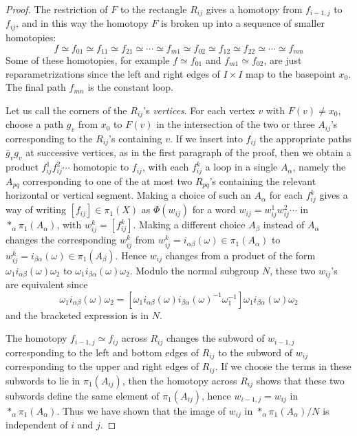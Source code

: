 \begin{proof}
The restriction of $F$ to the rectangle $R_{ij}$ gives a homotopy from $f_{i-1,j}$ to $f_{ij}$, and in this way the homotopy $F$ is broken up into a sequence of smaller homotopies:
\[
f \simeq f_{01} \simeq f_{11} \simeq f_{21} \simeq \cdots \simeq f_{m1} \simeq f_{02} \simeq f_{12} \simeq f_{22} \simeq \cdots \simeq f_{mn}
\]
Some of these homotopies, for example $f \simeq f_{01}$ and $f_{m1} \simeq f_{02}$, are just reparametrizations since the left and right edges of $I \times I$ map to the basepoint $x_0$. The final path $f_{mn}$ is the constant loop.

Let us call the corners of the $R_{ij}$'s \textit{vertices}. For each vertex $v$ with $F(v) \neq x_0$, choose a path $g_v$ from $x_0$ to $F(v)$ in the intersection of the two or three $A_{ij}$'s corresponding to the $R_{ij}$'s containing $v$. If we insert into $f_{ij}$ the appropriate paths $\bar{g}_v g_v$ at successive vertices, as in the first paragraph of the proof, then we obtain a product $f_{ij}^1 f_{ij}^2 \cdots$ homotopic to $f_{ij}$, with each $f_{ij}^k$ a loop in a single $A_\alpha$, namely the $A_{pq}$ corresponding to one of the at most two $R_{pq}$'s containing the relevant horizontal or vertical segment. Making a choice of such an $A_\alpha$ for each $f_{ij}^k$ gives a way of writing $[f_{ij}] \in \pi_1(X)$ as $\Phi(w_{ij})$ for a word $w_{ij} = w_{ij}^1 w_{ij}^2 \cdots$ in $*_\alpha \pi_1(A_\alpha)$, with $w_{ij}^k = [f_{ij}^k]$. Making a different choice $A_\beta$ instead of $A_\alpha$ changes the corresponding $w_{ij}^k$ from $w_{ij}^k = i_{\alpha\beta}(\omega) \in \pi_1(A_\alpha)$ to $w_{ij}^k = i_{\beta\alpha}(\omega) \in \pi_1(A_\beta)$. Hence $w_{ij}$ changes from a product of the form $\omega_1 i_{\alpha\beta}(\omega) \omega_2$ to $\omega_1 i_{\beta\alpha}(\omega) \omega_2$. Modulo the normal subgroup $N$, these two $w_{ij}$'s are equivalent since
\[
\omega_1 i_{\alpha\beta}(\omega) \omega_2 = [\omega_1 i_{\alpha\beta}(\omega) i_{\beta\alpha}(\omega)^{-1} \omega_1^{-1}] \omega_1 i_{\beta\alpha}(\omega) \omega_2
\]
and the bracketed expression is in $N$.

The homotopy $f_{i-1,j} \simeq f_{ij}$ across $R_{ij}$ changes the subword of $w_{i-1,j}$ corresponding to the left and bottom edges of $R_{ij}$ to the subword of $w_{ij}$ corresponding to the upper and right edges of $R_{ij}$. If we choose the terms in these subwords to lie in $\pi_1(A_{ij})$, then the homotopy across $R_{ij}$ shows that these two subwords define the same element of $\pi_1(A_{ij})$, hence $w_{i-1,j} = w_{ij}$ in $*_\alpha \pi_1(A_\alpha)$. Thus we have shown that the image of $w_{ij}$ in $*_\alpha \pi_1(A_\alpha)/N$ is independent of $i$ and $j$.


\end{proof}
